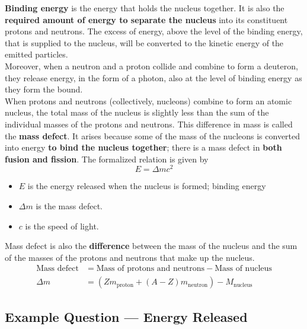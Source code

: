 \documentclass[a4paper,12pt]{article}
\newcommand{\lb}{\\[8pt]}
\begin{document}
\textbf{Binding energy} is the energy that holds the nucleus together. It is also the \textbf{required amount of energy to separate the nucleus} into its constituent protons and neutrons. The excess of energy, above the level of the binding energy, that is supplied to the nucleus, will be converted to the kinetic energy of the emitted particles.\lb
Moreover, when a neutron and a proton collide and combine to form a deuteron, they release energy, in the form of a photon, also at the level of binding energy as they form the bound.\lb
When protons and neutrons (collectively, nucleons) combine to form an atomic nucleus, the total mass of the nucleus is slightly less than the sum of the individual masses of the protons and neutrons. This difference in mass is called the \textbf{mass defect}. It arises because some of the mass of the nucleons is converted into energy \textbf{to bind the nucleus together}; there is a mass defect in \textbf{both fusion and fission}. The formalized relation is given by
$$E = \Delta mc^2$$
\begin{itemize}
  \item $E$ is the energy released when the nucleus is formed; binding energy
  \item $\Delta m$ is the mass defect.
  \item $c$ is the speed of light.
\end{itemize}
Mass defect is also the \textbf{difference} between the mass of the nucleus and the sum of the masses of the protons and neutrons that make up the nucleus.
\begin{align*}
  \text{Mass defect} & = \text{Mass of protons and neutrons} - \text{Mass of nucleus}             \\
  \Delta m           & = \left(Zm_\text{proton} + (A-Z)m_\text{neutron}\right) - M_\text{nucleus}
\end{align*}

\pagebreak

\subsection{Example Question --- Energy Released}
\end{document}
